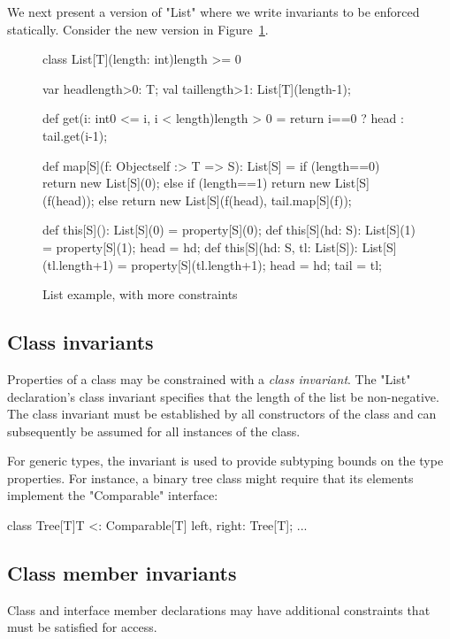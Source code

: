 We next present a version of \xcd"List" where we write
invariants to be enforced statically.  Consider the new version
in Figure~\ref{fig:list}.

\begin{figure}
{\footnotesize
\begin{xtennoindent}
class List[T](length: int){length >= 0} {
  var head{length>0}: T;
  val tail{length>1}: List[T](length-1);

  def get(i: int{0 <= i, i < length}){length > 0} = {
    return i==0 ? head : tail.get(i-1);
  }

  def map[S](f: Object{self :> T} => S): List[S] = {
    if (length==0)
      return new List[S](0);
    else if (length==1)
      return new List[S](f(head));
    else
      return new List[S](f(head), tail.map[S](f));
  }

  def this[S](): List[S](0) = property[S](0);
  def this[S](hd: S): List[S](1) = {
    property[S](1); head = hd;
  }
  def this[S](hd: S, tl: List[S]): List[S](tl.length+1) = {
    property[S](tl.length+1);
    head = hd; tail = tl;
  }
}
\end{xtennoindent}}
\caption{List example, with more constraints}
\label{fig:list}
\end{figure}

\subsection{Class invariants}

Properties of a class may be constrained with 
a \emph{class invariant}.   
The \xcd"List" declaration's class invariant specifies that the length of
the list be non-negative.  
The class invariant must be established by all constructors of
the class and can subsequently be assumed for all instances of the class.

For generic types, the invariant is used to provide subtyping
bounds on the type properties.  For instance, a binary
tree class
might require that its elements implement the \xcd"Comparable"
interface:
{\footnotesize
\begin{xten}
class Tree[T]{T <: Comparable[T]} {
  left, right: Tree[T]; ...
}
\end{xten}}

\subsection{Class member invariants}

Class and interface member declarations may have additional
constraints that must be satisfied for access.


